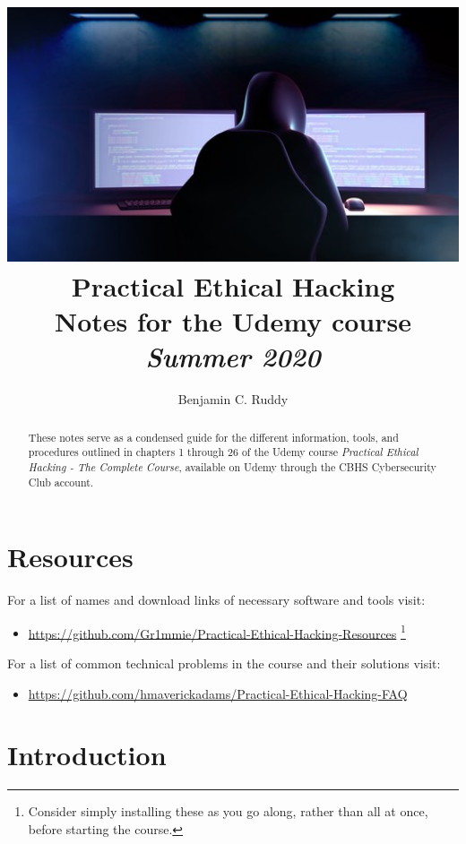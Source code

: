 \documentclass[a4paper,11pt]{article}
\title{
    \vspace*{1cm}
    \centering
    \includegraphics[width=1\textwidth]{images/hacker.jpg}
    \\[-4.7cm]
    \vspace{2in}
    \textmd{\textbf{Practical Ethical Hacking}}\\
    \normalsize\vspace{0.1in}\small{Notes for the Udemy course}\\
    \vspace{0.1in}\large{\textit{Summer 2020}}
    \vspace{2.7in}
}
\author{Benjamin C. Ruddy}
\date{}
\begin{document}
\begin{titlepage}
\clearpage\maketitle
\thispagestyle{empty}
\end{titlepage}
\pagebreak
\begin{abstract}
\noindent These notes serve as a condensed guide for the different information, tools, and procedures outlined in chapters 1 through 26 of the Udemy course \textit{Practical Ethical Hacking - The Complete Course}, available on Udemy through the CBHS Cybersecurity Club account.
\end{abstract}


\section{Resources}

For a list of names and download links of necessary software and tools visit:
\begin{itemize}
\label{resources}\item{\url{https://github.com/Gr1mmie/Practical-Ethical-Hacking-Resources}
\footnote[2]{Consider simply installing these as you go along, rather than all at once, before starting the course.}
}
\end{itemize}
For a list of common technical problems in the course and their solutions visit:
\begin{itemize}
\item{\url{https://github.com/hmaverickadams/Practical-Ethical-Hacking-FAQ}}
\end{itemize}


\section{Introduction}
\end{document}
